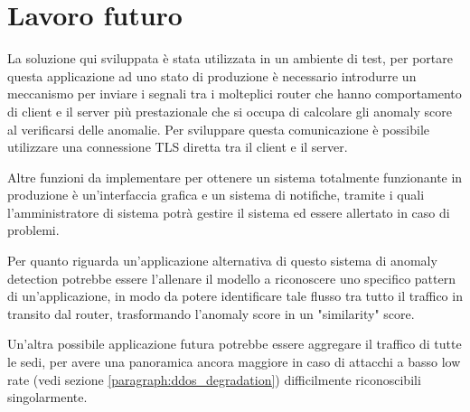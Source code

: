 \chapter{Lavoro futuro}

La soluzione qui sviluppata è stata utilizzata in un ambiente di test, per portare questa applicazione ad uno stato di produzione è necessario introdurre un meccanismo per inviare i segnali tra i molteplici router che hanno comportamento di client e il server più prestazionale che si occupa di calcolare gli anomaly score al verificarsi delle anomalie. Per sviluppare questa comunicazione è possibile utilizzare una connessione TLS diretta tra il client e il server.

Altre funzioni da implementare per ottenere un sistema totalmente funzionante in produzione è un'interfaccia grafica e un sistema di notifiche, tramite i quali l'amministratore di sistema potrà gestire il sistema ed essere allertato in caso di problemi. 



Per quanto riguarda un'applicazione alternativa di questo sistema di anomaly detection potrebbe essere l'allenare il modello a riconoscere uno specifico pattern di un'applicazione, in modo da potere identificare tale flusso tra tutto il traffico in transito dal router, trasformando l'anomaly score in un "similarity" score.

Un'altra possibile applicazione futura potrebbe essere aggregare il traffico di tutte le sedi, per avere una panoramica ancora maggiore in caso di attacchi a basso low rate (vedi sezione \ref{paragraph:ddos_degradation}) difficilmente riconoscibili singolarmente.